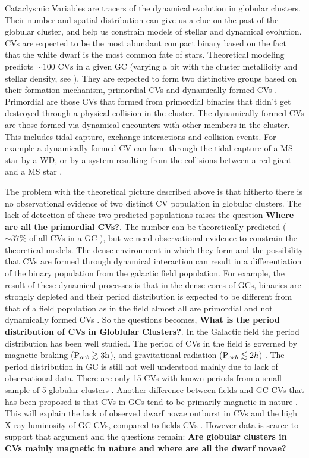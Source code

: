 Cataclysmic Variables are tracers of the dynamical evolution in globular clusters. Their number and spatial distribution can give us a clue on the past of the globular cluster, and help us constrain models of stellar and dynamical evolution. CVs are expected to be the most abundant compact binary based on the fact that the white dwarf is the most common fate of stars. Theoretical modeling predicts $\sim 100 \text{ CVs}$ in a given GC (varying a bit with the cluster metallicity and stellar density, see \cite{ivanova_formation_2006}). They are expected to form two distinctive groups based on their formation mechanism, primordial CVs and dynamically formed CVs \citep[e.g.][]{hut_binaries_1992}. Primordial are those CVs that formed from primordial binaries that didn't get destroyed through a physical collision in the cluster. The dynamically formed CVs are those formed via dynamical encounters with other members in the cluster. This includes tidal capture, exchange interactions and collision events. For example a dynamically formed CV can form through the tidal capture of a MS star by a WD, or by a system resulting from the collisions between a red giant and a MS star \citep{ivanova_formation_2006}. 

The problem with the theoretical picture described above is that hitherto there is no observational evidence of two distinct CV population in globular clusters. The lack of detection of these two predicted populations raises the question \textbf{Where are all the primordial CVs?}. The number can be theoretically predicted ($\sim 37 \%$ of all CVs in a GC \citep{ivanova_formation_2006}), but we need observational evidence to constrain the theoretical models. The dense environment in which they form and the possibility that CVs are formed through dynamical interaction can result in a differentiation of the binary population from the galactic field population. For example, the result of these dynamical processes is that in the dense cores of GCs, binaries are strongly depleted and their period distribution is expected to be different from that of a field population as in the field almost all are primordial and not dynamically formed CVs \citep{ivanova_evolution_2005}. So the questions becomes, \textbf{What is the period distribution of CVs in Globlular Clusters?}. In the Galactic field the period distribution has been well studied. The period of CVs in the field is governed by magnetic braking ($\text P _{orb} \gtrsim  3 \text h$), and gravitational radiation ($\text P _{orb} \lesssim 2 h$) \citep{Robinson_period_1983}. The period distribution in GC is still not well understood mainly due to lack of observational data. There are only 15 CVs with known periods from a small sample of 5 globular clusters \citep{knigge_cataclysmic_2012}. Another difference between fields and GC CVs that has been proposed is that CVs in GCs tend to be primarily magnetic in nature \citep{grindlay_magnetic_1999}. This will explain the lack of observed dwarf novae outburst in CVs \citep{shara_CVsDN_1996} and the high X-ray luminosity of GC CVs, compared to fields CVs \citep{verbunt_cataclysmic_1997}. However data is scarce to support that argument and the questions remain: \textbf{Are globular clusters in CVs mainly magnetic in nature and where are all the dwarf novae?} 

